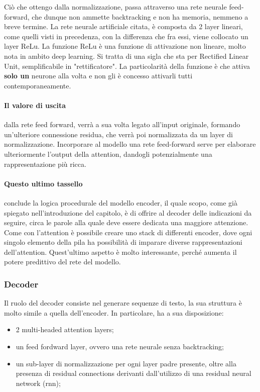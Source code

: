 Ciò che ottengo dalla normalizzazione, passa attraverso una rete neurale feed-forward, che dunque non ammette backtracking e non ha memoria, nemmeno a breve termine. 
La rete neurale artificiale citata, è composta da 2 layer lineari, come quelli visti in precedenza, con la differenza che fra essi, viene collocato un layer ReLu.
La funzione ReLu è una funzione di attivazione non lineare, molto nota in ambito deep learning. Si tratta di una sigla che sta per Rectified Linear Unit, semplificabile in "rettificatore". La particolarità della funzione è che attiva \textbf{solo un} neurone alla volta e non gli è concesso attivarli tutti contemporaneamente. 

\paragraph{Il valore di uscita} dalla rete feed forward, verrà a sua volta legato all'input originale, formando un'ulteriore connessione residua, che verrà poi normalizzata da un layer di normalizzazione. Incorporare al modello una rete feed-forward serve per elaborare ulteriormente l'output della attention, dandogli potenzialmente una rappresentazione più ricca.
\paragraph{Questo ultimo tassello} conclude la logica procedurale del modello encoder, il quale scopo, come già spiegato nell'introduzione del capitolo, è di offrire al decoder delle indicazioni da seguire, circa le parole alla quale deve essere dedicata una maggiore attenzione. Come con l'attention è possibile creare uno stack di differenti encoder, dove ogni singolo elemento della pila ha possibilità di imparare diverse rappresentazioni dell'attention. Quest'ultimo aspetto è molto interessante, perché aumenta il potere predittivo del rete del modello.

\subsubsection{Decoder}

Il ruolo del decoder consiste nel generare sequenze di testo, la sua struttura è molto simile a quella dell'encoder. 
In particolare, ha a sua disposizione:
\begin{itemize}
	\item 2 multi-headed attention layers;
	\item un feed fordward layer, ovvero una rete neurale senza backtracking;
	\item un sub-layer di normalizzazione per ogni layer padre presente, oltre alla presenza di residual connections derivanti dall'utilizzo di una residual neural network (rnn);
\end{itemize}

